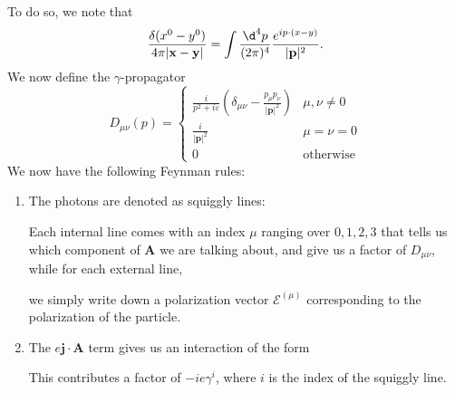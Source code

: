 \documentclass[a4paper]{article}
\begin{document}
To do so, we note that
\[
  \frac{\delta(x^0 - y^0)}{4\pi |\mathbf{x} - \mathbf{y}|} = \int \frac{\d^4 p}{(2\pi)^4} \frac{e^{ip\cdot(x - y)}}{|\mathbf{p}|^2}.
\]
We now define the $\gamma$-propagator
\[
  D_{\mu\nu}(p) =
  \begin{cases}
    \frac{i}{p^2 + i\varepsilon} \left(\delta_{\mu\nu} - \frac{p_\mu p_\nu}{|\mathbf{p}|^2}\right) & \mu, \nu \not= 0\\
    \frac{i}{|\mathbf{p}|^2} & \mu = \nu = 0\\
    0 & \text{otherwise}
  \end{cases}
\]
We now have the following Feynman rules:
\begin{enumerate}
  \item The photons are denoted as squiggly lines:
    \begin{center}
    \end{center}
    Each internal line comes with an index $\mu$ ranging over $0, 1, 2, 3$ that tells us which component of $\mathbf{A}$ we are talking about, and give us a factor of $D_{\mu\nu}$, while for each external line,
     \begin{center}
    \end{center}
    we simply write down a polarization vector $\mathcal{E}^{(\mu)}$ corresponding to the polarization of the particle.

  \item The $e \mathbf{j}\cdot \mathbf{A}$ term gives us an interaction of the form
    \begin{center}
    \end{center}
    This contributes a factor of $-ie\gamma^i$, where $i$ is the index of the squiggly line.
\end{enumerate}
\end{document}
